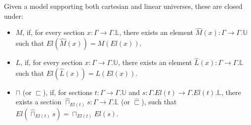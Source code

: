 \documentclass[a4paper,english]{lipics-v2018}
\begin{document}
  \begin{definition}
    Given a model supporting both cartesian and linear universes, these are closed under:
    \begin{itemize}
    \item $M$, if, for every section $x : \Gamma \to \Gamma.\mathbb{L}$, there exists an element $\hat M(x) : \Gamma \to \Gamma.\mathbb{U}$ such that $El(\hat M(x)) = M(El(x))$.
    \item $L$, if, for every section $x : \Gamma \to \Gamma.\mathbb{U}$, there exists an element $\hat L(x) : \Gamma \to \Gamma.\mathbb{L}$ such that $El(\hat L(x)) = L(El(x))$.
    \item $\sqcap$ (or $\sqsubset$), if, for sections $t : \Gamma \to \Gamma.\mathbb{U}$ and $s : \Gamma.El(t) \to \Gamma.El(t).\mathbb{L}$, there exists a section $\hat \sqcap_{El(t)}s : \Gamma \to \Gamma.\mathbb{L}$ (or $\hat \sqsubset$), such that $El(\hat \sqcap_{El(t)}s) = \sqcap_{El(t)}El(s)$.
    \end{itemize}
\end{definition}
\end{document}

